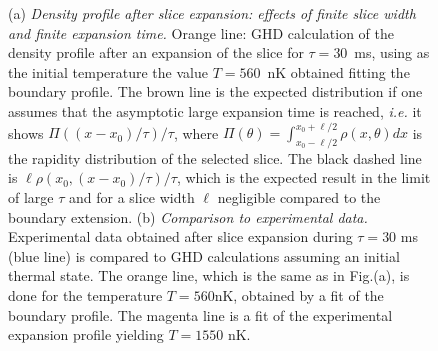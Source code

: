 		\begin{figure}[!htb]
		
    	
    		\caption{(a) {\it Density profile after slice expansion: effects of finite slice width and finite expansion time.} Orange line:  GHD calculation of the density profile after an expansion of the  slice for $\tau=30$~ms, using as the initial temperature the value $T=560$~nK obtained fitting the boundary profile.  The brown  line
    		is the expected distribution if one 
    		assumes that the asymptotic large expansion time is reached, {\it i.e.} it shows
    		 $\Pi((x-x_0)/\tau)/\tau$, where  $\Pi(\theta)=\int_{x_0-\ell/2}^{x_0+\ell/2} \rho(x,\theta) d x$ is the rapidity distribution of the selected slice. %
    		The  black dashed line is $\ell \rho(x_0, (x-x_0)/\tau)/\tau$, which is the expected result in the limit of large $\tau$ and for a slice width $\ell$ negligible compared to the boundary extension. %
    		(b) {\it Comparison to experimental data.} Experimental data obtained after slice expansion during $\tau=30$ ms (blue line) is  compared to GHD calculations assuming an initial thermal state. 
    		 The  orange line, which is the same as in Fig.(a), is done for the temperature  $T=560 $nK, obtained by a fit of the boundary profile. The magenta line is a fit of the experimental expansion profile yielding $T=1550$ nK.
    		}
   			\label{fig:simul_expansion}					
		\end{figure}
		

